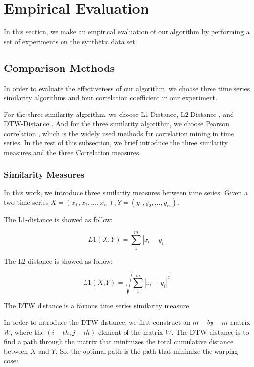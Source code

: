 \section{Empirical Evaluation}
In this section, we make an empirical evaluation of our algorithm by performing a set of experiments on the synthetic data set.

\subsection{Comparison Methods}
In order to evaluate the effectiveness of our algorithm, we choose three time series similarity algorithms and four correlation coefficient in our experiment. 

For the three similarity algorithm, we choose L1-Distance, L2-Distance \cite{han2011data}, and DTW-Distance \cite{muller2007dynamic}. And for the three similarity algorithm, we choose Pearson correlation \cite{nagelkerke1991note}, which is the widely used methods for correlation mining in time series.
In the rest of this subsection, we brief introduce the three similarity measures and the three Correlation measures.
 
\subsubsection{Similarity Measures}

In this work, we introduce three similarity measures between time series.
Given a two time series 
$X=(x_1,x_2,...,x_m),Y=(y_1,y_2,...,y_m)$.

The L1-distance is showed as follow:

\begin{equation}
L1(X,Y) = \sum_{1}^{m}|x_i-y_i|
\end{equation}

The L2-distance is showed as follow:

\begin{equation}
L1(X,Y) = \sqrt{\sum_{1}^{m}|x_i-y_i|^2}
\end{equation}

The DTW distance is a famous time series similarity measure.

In order to introduce the DTW distance, we first construct an $m-by-m$ matrix $W$, where the $(i-{th},j-{th})$ element of the matrix $W$. The DTW distance is to find a path through the matrix that minimizes the total cumulative distance between $X$ and $Y$. 
So, the optimal path is the path that minimize the warping cose:

